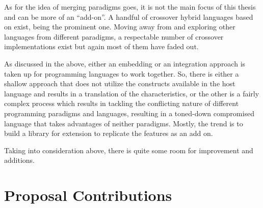 \documentclass[thesis-solanki.tex]{subfiles}
\begin{document}
As for the idea of merging paradigms goes, it is not the main focus of this thesis and can be more of an
``add-on''.
A handful of crossover hybrid languages based on  exist,  \cite{website:curry}
being the prominent one.
Moving away from  and exploring other languages from different paradigms, a respectable number of
crossover implementations exist but again most of them have faded out.

As discussed in the above,
either an embedding or an integration approach is taken up for programming
languages to work together.
So, there is either a shallow approach that does not utilize the constructs available in the host language and
results in a translation of the characteristics, or the other is a fairly complex process which results in
tackling the conflicting nature of different programming paradigms and languages, resulting in a toned-down
compromised language that takes advantages of neither paradigms.
Mostly, the trend is to build a library for extension to replicate the features as an add on.

Taking into consideration above, there is quite some room for improvement and additions.
\section{Proposal Contributions}
\end{document}
